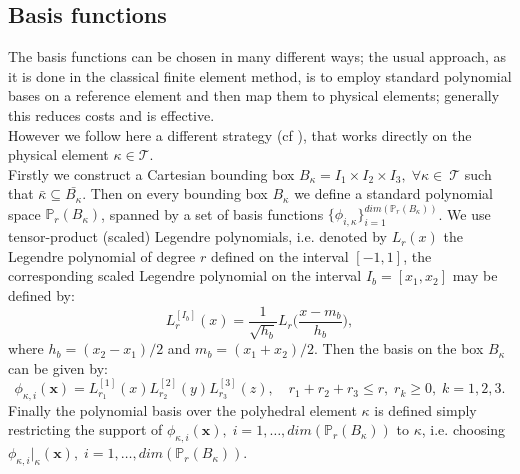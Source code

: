 \documentclass[12pt, a4paper]{article}
\theoremstyle{definition}
\theoremstyle{plain}
\theoremstyle{plain}
\begin{document}
\subsection{Basis functions}
The basis functions can be chosen in many different ways; the usual approach, as it is done in the classical finite element method, is to employ standard polynomial bases on a reference element and then map them to physical elements; generally this reduces costs and is effective.\\
However we follow here a different strategy (cf \cite{hpmet}), that works directly on the physical element $\kappa \in \mathcal{T}$.\\
Firstly we construct a Cartesian bounding box $B_\kappa=I_1\times I_2 \times I_3, \; \forall\kappa\in~\mathcal{T} $ such that $\bar{\kappa} \subseteq \bar{B_\kappa}$. Then on every bounding box $B_\kappa$ we define a standard polynomial space $\mathbb{P}_r(B_\kappa)$, spanned by a set of basis functions $\{ \phi_{i,\kappa} \}_{i=1}^{dim(\mathbb{P}_r(B_\kappa))}$. We use tensor-product (scaled) Legendre polynomials, i.e. denoted by $L_r(x)$ the Legendre polynomial of degree $r$ defined on the interval $[-1, 1]$, the corresponding scaled Legendre polynomial on the interval $I_b = [x_1, x_2]$ may be defined by:
\begin{equation*}
	L_r^{[I_b]} (x) = \frac{1}{\sqrt{h_b}} L_r \bigg( \frac{x-m_b}{h_b} \bigg),
\end{equation*}
where $h_b = (x_2-x_1)/2$ and $m_b = (x_1+x_2)/2$. Then the basis on the box $B_\kappa$ can be given by:
\begin{equation*}
\phi_{\kappa,i}(\mathbf{x}) = L_{r_1}^{[1]}(x)L_{r_2}^{[2]}(y)L_{r_3}^{[3]}(z), \quad
r_1+r_2+r_3 \leq r, \; r_k \geq 0, \; k = 1,2,3.
\end{equation*}
Finally the polynomial basis over the polyhedral element $\kappa$ is defined simply restricting the support of $\phi_{\kappa, i}(\mathbf{x}), \; i=1,\dots,dim(\mathbb{P}_r(B_\kappa))$ to $\kappa$, i.e. choosing  $\phi_{\kappa, i}|_\kappa (\mathbf{x}), \; i=1,\dots,dim(\mathbb{P}_r(B_\kappa))$.
\end{document}
